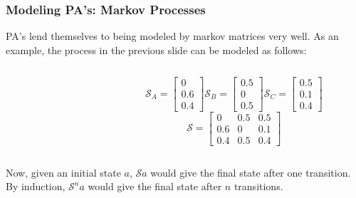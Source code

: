\documentclass{beamer}
\begin{document}
\begin{frame}[fragile]
\frametitle{Modeling PA's: Markov Processes}

PA's lend themselves to being modeled by markov matrices very well. As an example,
the process in the previous slide can be modeled as follows:

\pause 
\begin{center}
\begin{columns}[onlytextwidth]
\begin{column}{0.3\textwidth}
\end{column}
\begin{column}{0.7\textwidth}
$$
\mathcal{S}_A = \begin{bmatrix} 0 \\ 0.6 \\ 0.4 \end{bmatrix}
\mathcal{S}_B = \begin{bmatrix} 0.5 \\ 0 \\ 0.5 \end{bmatrix}
\mathcal{S}_C = \begin{bmatrix} 0.5 \\ 0.1 \\ 0.4 \end{bmatrix}$$
$$
\mathcal{S} = \begin{bmatrix}
0 & 0.5 & 0.5 \\
0.6 & 0 & 0.1 \\
0.4 & 0.5 & 0.4
\end{bmatrix}
$$
\end{column}
\end{columns}
\end{center}
\pause
Now, given an initial state $a$, $\mathcal{S}a$ would give the final state after
one transition. By induction, $\mathcal{S}^n a$ would give the final state after
$n$ transitions.
\end{frame}
\end{document}
